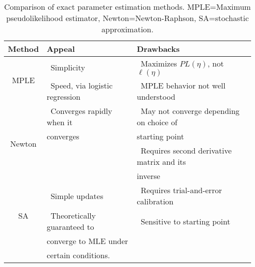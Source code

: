 \begin{table}[h!] 
\caption[Comparison of exact parameter estimation methods]{Comparison of exact parameter estimation methods. MPLE=Maximum pseudolikelihood estimator, Newton=Newton-Raphson,
SA=stochastic approximation.\\}

\begin{tabular}{|c|l|l|}
\hline 
Method & Appeal & Drawbacks \\ [1ex]
\hline
\multirow{2}{0.5in}{MPLE}		
& 	\textbullet \, Simplicity 				  	& \textbullet \, Maximizes $PL(\eta)$, not $\ell(\eta)$  \\
& 	\textbullet \, Speed, via logistic regression 	& \textbullet \, MPLE behavior not well understood \\ [1ex]
\hline
\multirow{4}{0.5in}{Newton}
& 	\textbullet \, Converges rapidly when it   	& \textbullet \, May not converge depending on choice of\\ 
& 	converges 	& starting point \\				
&				& \textbullet \, Requires second derivative matrix and its\\
&				& inverse \\[1ex]
\hline
\multirow{3}{0.5in}{SA} 		
& 	\textbullet \, Simple updates 				& \textbullet \, Requires trial-and-error calibration  \\			& 	\textbullet \, Theoretically guaranteed to		& \textbullet \, Sensitive to starting point \\
& 	converge to MLE under  & \\
& 	certain conditions.  & \\[1ex]
\hline 
\end{tabular} 
\label{T:Compare estimation}
\end{table}


